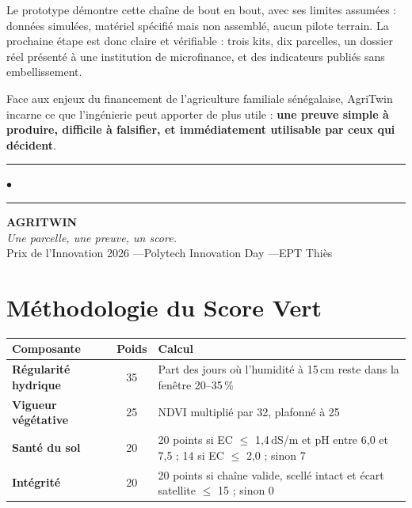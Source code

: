 \documentclass[12pt, a4paper]{article}
\begin{document}
Le prototype démontre cette chaîne de bout en bout, avec ses limites assumées : données
simulées, matériel spécifié mais non assemblé, aucun pilote terrain. La prochaine étape est
donc claire et vérifiable : trois kits, dix parcelles, un dossier réel présenté à une
institution de microfinance, et des indicateurs publiés sans embellissement.

\vspace{0.4cm}

Face aux enjeux du financement de l'agriculture familiale sénégalaise, AgriTwin incarne ce
que l'ingénierie peut apporter de plus utile : \textbf{une preuve simple à produire,
difficile à falsifier, et immédiatement utilisable par ceux qui décident}.

\vspace{1.2cm}

\begin{center}
  \textcolor{rule}{\rule{4cm}{0.4pt}}
  \quad\textcolor{accent}{\large$\bullet$}\quad
  \textcolor{rule}{\rule{4cm}{0.4pt}}

  \vspace{0.5cm}
  {\Large\textbf{\textcolor{primary}{AGRITWIN}}}\\[5pt]
  \textit{\textcolor{muted}{Une parcelle, une preuve, un score.}}\\[8pt]
  \small\textcolor{muted}{Prix de l'Innovation 2026 \quad—\quad Polytech Innovation Day \quad—\quad EPT Thiès}
\end{center}

\newpage
\appendix
\section{Méthodologie du Score Vert}

\begin{center}
\begin{tabularx}{\linewidth}{>{\bfseries\color{primary}}l c X}
  \toprule
  \rowcolor{lightbg}
  Composante & Poids & Calcul \\
  \midrule
  Régularité hydrique & 35 & Part des jours où l'humidité à 15\,cm reste dans la fenêtre 20–35\,\% \\
  \addlinespace
  Vigueur végétative & 25 & NDVI multiplié par 32, plafonné à 25 \\
  \addlinespace
  Santé du sol & 20 & 20 points si EC $\leq$ 1,4\,dS/m et pH entre 6,0 et 7,5 ; 14 si EC $\leq$ 2,0 ; sinon 7 \\
  \addlinespace
  Intégrité & 20 & 20 points si chaîne valide, scellé intact et écart satellite $\leq$ 15 ; sinon 0 \\
  \bottomrule
\end{tabularx}
\end{center}
\end{document}
